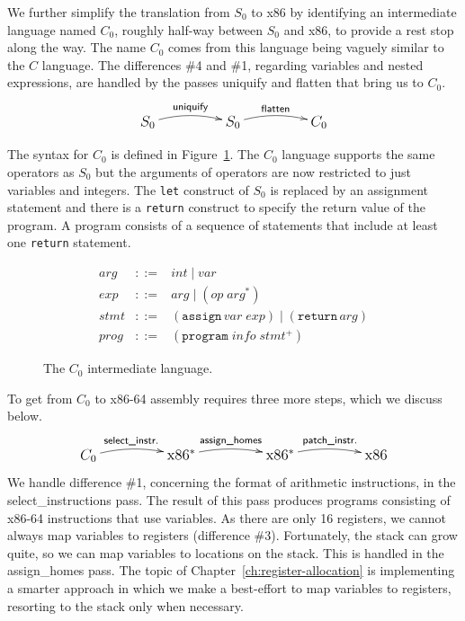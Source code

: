\documentclass[12pt]{book}
\newcommand{\itm}[1]{\ensuremath{\mathit{#1}}}
\newcommand{\Stmt}{\itm{stmt}}
\newcommand{\Exp}{\itm{exp}}
\newcommand{\Prog}{\itm{prog}}
\newcommand{\Arg}{\itm{arg}}
\newcommand{\Int}{\itm{int}}
\newcommand{\Var}{\itm{var}}
\newcommand{\Op}{\itm{op}}
\newcommand{\key}[1]{\texttt{#1}}
\newcommand{\ASSIGN}[2]{(\key{assign}\,#1\;#2)}
\newcommand{\RETURN}[1]{(\key{return}\,#1)}
\begin{document}
We further simplify the translation from $S_0$ to x86 by identifying
an intermediate language named $C_0$, roughly half-way between $S_0$
and x86, to provide a rest stop along the way. The name $C_0$ comes
from this language being vaguely similar to the $C$ language. The
differences \#4 and \#1, regarding variables and nested expressions,
are handled by the passes \textsf{uniquify} and \textsf{flatten} that
bring us to $C_0$.
\[\large
\xymatrix@=50pt{
  S_0 \ar@/^/[r]^-{\textsf{uniquify}} & 
  S_0 \ar@/^/[r]^-{\textsf{flatten}} &
  C_0 
}
\]

The syntax for $C_0$ is defined in Figure~\ref{fig:c0-syntax}.  The
$C_0$ language supports the same operators as $S_0$ but the arguments
of operators are now restricted to just variables and integers. The
\key{let} construct of $S_0$ is replaced by an assignment statement
and there is a \key{return} construct to specify the return value of
the program. A program consists of a sequence of statements that
include at least one \key{return} statement.

\begin{figure}[htbp]
\[
\begin{array}{lcl}
\Arg &::=& \Int \mid \Var \\
\Exp &::=& \Arg \mid (\Op \; \Arg^{*})\\
\Stmt &::=& \ASSIGN{\Var}{\Exp} \mid \RETURN{\Arg} \\
\Prog & ::= & (\key{program}\;\itm{info}\;\Stmt^{+})
\end{array}
\]
\caption{The $C_0$ intermediate language.}
\label{fig:c0-syntax}
\end{figure}


To get from $C_0$ to x86-64 assembly requires three more steps, which
we discuss below.
\[\large
\xymatrix@=50pt{
  C_0 \ar@/^/[r]^-{\textsf{select\_instr.}}
  & \text{x86}^{*} \ar@/^/[r]^-{\textsf{assign\_homes}} 
  & \text{x86}^{*} \ar@/^/[r]^-{\textsf{patch\_instr.}}
  & \text{x86}
}
\]
We handle difference \#1, concerning the format of arithmetic
instructions, in the \textsf{select\_instructions} pass.  The result
of this pass produces programs consisting of x86-64 instructions that
use variables.
%
As there are only 16 registers, we cannot always map variables to
registers (difference \#3). Fortunately, the stack can grow quite, so
we can map variables to locations on the stack. This is handled in the
\textsf{assign\_homes} pass. The topic of
Chapter~\ref{ch:register-allocation} is implementing a smarter
approach in which we make a best-effort to map variables to registers,
resorting to the stack only when necessary.
\end{document}
